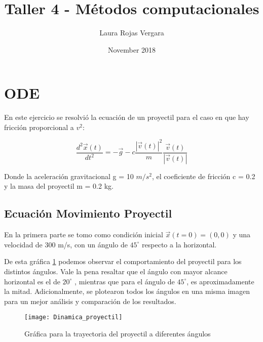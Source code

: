 \documentclass{article}
\title{Taller 4 - Métodos computacionales}
\author{Laura Rojas Vergara}
\date{November 2018}
\begin{document}
\maketitle

\section{ODE}

En este ejercicio se resolvió la ecuación de un proyectil para el caso en que hay fricción proporcional a $v^2$:

\begin{equation}
   \frac{d^2\vec{x}(t)}{dt^2} = -\vec{g}-c \frac{|\vec{v}(t)|^2}{m} \frac{\vec{v}(t)}{|\vec{v}(t)|}
\end{equation}

Donde la aceleración gravitacional g = 10 $m/s^2$, el coeficiente de fricción c = 0.2 y la masa del proyectil m = 0.2 kg. 

\subsection{Ecuación Movimiento Proyectil}

En la primera parte se tomo como condición inicial $\vec{x}(t = 0) = (0,0)$ y una velocidad de 300 m/s, con un ángulo de $45^\circ$ respecto a la horizontal. 



De esta gráfica \ref{proyectil} podemos observar el comportamiento del proyectil para los distintos ángulos. Vale la pena resaltar que el ángulo con mayor alcance horizontal es el de $20^\circ$ , mientras que para el ángulo de $45^\circ$, es aproximadamente la mitad. Adicionalmente, se plotearon todos los ángulos en una misma imagen para un mejor análisis y comparación de los resultados.

\begin{figure}[h!]
\centering
\texttt{[image: Dinamica\_proyectil]}
\caption{Gráfica para la trayectoria del proyectil a diferentes ángulos}
\label{proyectil}
\end{figure}



%
%
\end{document}
